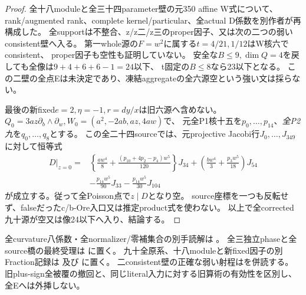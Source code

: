 \documentclass[a4paper,11pt]{ltjsarticle}
\theoremstyle{definition}
\begin{document}
\begin{proof}
全十八moduleと全三十四parameter壁の元350 affine W式について、
rank/augmented rank、complete kernel/particular、全actual D係数を別作者が再構成した。
全supportは不整合、z/z二/z三のproper因子、又は次の二つの弱いconsistent壁へ入る。
第一whole源の$F=w^2$に属する$t=4/21,1/12$はW核六でconsistent、
proper因子も空性も証明していない。
安全な$B\le9,\dim Q=4$を戻しても全像は$9+4+6+6-1=24$以下、
t固定の$B\le8$なら23以下となる。
この二壁の全点Eは未決定であり、凍結aggregateの全六源空という強い文は採らない。

最後の新fixed$e=2,\eta=-1,r=dy/x$は旧六源へ含めない。
$Q_0=3az\partial_b\wedge\partial_w,W_0=(a^2,-2ab,az,4aw)$で、
元全P1核十五を$p_0,\ldots,p_{14}$、\emph{全P2九}を$q_0,\ldots,q_8$とする。
この全二十四sourceでは、元projective Jacobi行$J_0,\ldots,J_{349}$に対して恒等式
\[
\begin{split}
 D|_{z=0}={}&\left\{\frac{aw^4}{8}
       +\frac{(p_{10}+4p_2-p_4)w^5}{120}\right\}J_{34}
       +\left(\frac{bw^4}{3}+\frac{p_3w^5}{18}\right)J_{54}\\
 &-\frac{p_{14}w^5}{90}J_{33}-\frac{p_{14}w^5}{30}J_{104}
\end{split}
\]
が成立する。従って全Poisson点で$z\mid D$となり空。
source座標を一つも反転せず、falseだったc/b-Ore入口又は推定product式を使わない。
以上で全corrected九十源が空又は像24以下へ入り、結論する。
\end{proof}
全curvature八係数・全normalizer/零補集合の別手読解は
。
全三独立phaseと全source橋の最終受理は
に置く。
九十全原系、十八moduleと新fixed因子の別Fraction記録は
及び
に置く。
二consistent壁の正確な弱い射程はを併読する。
旧plus-sign全被覆の撤回と、同じliteral入力に対する旧算術の有効性を区別し、全Eへは外挿しない。
\end{document}
